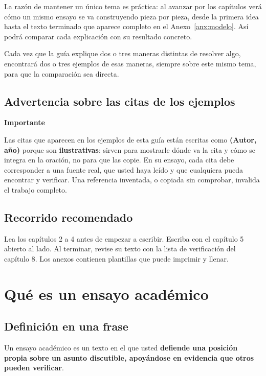 \documentclass[12pt,a4paper,openany]{report}
\newenvironment{aviso}[1]
	{\begin{lrbox}{\cajaguardada}\begin{minipage}{\dimexpr\textwidth-2\fboxsep\relax}\vspace{4pt}\textbf{\sffamily\small #1}\par\vspace{3pt}\small}
	{\vspace{4pt}\end{minipage}\end{lrbox}\par\vspace{4pt}\noindent\colorbox{grisclaro}{\usebox{\cajaguardada}}\par\vspace{8pt}}
\begin{document}
La raz\'on de mantener un \'unico tema es pr\'actica: al avanzar por los cap\'itulos ver\'a c\'omo un mismo ensayo se va construyendo pieza por pieza, desde la primera idea hasta el texto terminado que aparece completo en el Anexo~\ref{anx:modelo}. As\'i podr\'a comparar cada explicaci\'on con su resultado concreto.

Cada vez que la gu\'ia explique dos o tres maneras distintas de resolver algo, encontrar\'a dos o tres ejemplos de esas maneras, siempre sobre este mismo tema, para que la comparaci\'on sea directa.

\section{Advertencia sobre las citas de los ejemplos}

\begin{aviso}{Importante}
Las citas que aparecen en los ejemplos de esta gu\'ia est\'an escritas como \textbf{(Autor, a\~no)} porque son \textbf{ilustrativas}: sirven para mostrarle d\'onde va la cita y c\'omo se integra en la oraci\'on, no para que las copie. En su ensayo, cada cita debe corresponder a una fuente real, que usted haya le\'ido y que cualquiera pueda encontrar y verificar. Una referencia inventada, o copiada sin comprobar, invalida el trabajo completo.
\end{aviso}

\section{Recorrido recomendado}

Lea los cap\'itulos 2 a 4 antes de empezar a escribir. Escriba con el cap\'itulo 5 abierto al lado. Al terminar, revise su texto con la lista de verificaci\'on del cap\'itulo 8. Los anexos contienen plantillas que puede imprimir y llenar.

\chapter{Qu\'e es un ensayo acad\'emico}

\section{Definici\'on en una frase}

Un ensayo acad\'emico es un texto en el que usted \textbf{defiende una posici\'on propia sobre un asunto discutible, apoy\'andose en evidencia que otros pueden verificar}.
\end{document}
